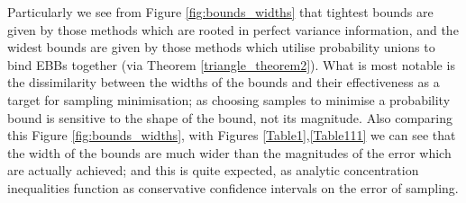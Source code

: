 Particularly we see from Figure \ref{fig:bounds_widths} that tightest bounds are given by those methods which are rooted in perfect variance information, and the widest bounds are given by those methods which utilise probability unions to bind EBBs together (via Theorem \ref{triangle_theorem2}).
What is most notable is the dissimilarity between the widths of the bounds and their effectiveness as a target for sampling minimisation; as choosing samples to minimise a probability bound is sensitive to the shape of the bound, not its magnitude.
Also comparing this Figure \ref{fig:bounds_widths}, with Figures \ref{Table1},\ref{Table111} we can see that the width of the bounds are much wider than the magnitudes of the error which are actually achieved; and this is quite expected, as analytic concentration inequalities function as conservative confidence intervals on the error of sampling.

%




